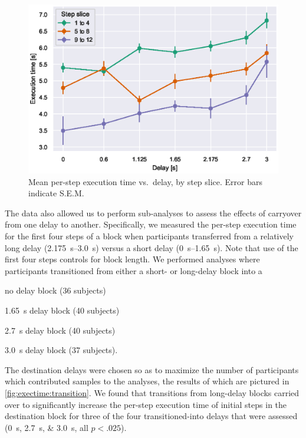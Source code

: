 \begin{figure}[h]
    \centering
    \includegraphics[width=.8\textwidth]{publications/2021ImpactDelayedResponse/Fig7.eps}
    \caption{Mean per-step execution time vs.\ delay, by step slice.
    Error bars indicate S.E.M.}
    \label{fig:exectime:delay:slice}
\end{figure}

The data also allowed us to perform sub-analyses to assess the effects of carryover from one delay to another.
Specifically, we measured the per-step execution time for the first four steps of a block when participants transferred from a relatively long delay (\SIrange{2.175}{3.0}{\second}) versus a short delay (\SIrange{0}{1.65}{\second}).
Note that use of the first four steps controls for block length.
We performed analyses where participants transitioned from either a short- or long-delay block into a
\begin{enumerate*}[label=(\roman*), before=\unskip{: }, itemjoin={{; }}, itemjoin*={{; and }}]
  \item no delay block (36 subjects)
  \item \SI{1.65}{\second} delay block (40 subjects)
  \item \SI{2.7}{\second} delay block (40 subjects)
  \item \SI{3.0}{\second} delay block (37 subjects).
\end{enumerate*}
The destination delays were chosen so as to maximize the number of participants which contributed samples to the analyses, the results of which are pictured in \cref{fig:exectime:transition}.
We found that transitions from long-delay blocks carried over to significantly increase the per-step execution time of initial steps in the destination block for three of the four transitioned-into delays that were assessed (\SIlist{0;2.7;3.0}{\second}, all \( p < .025\)).

